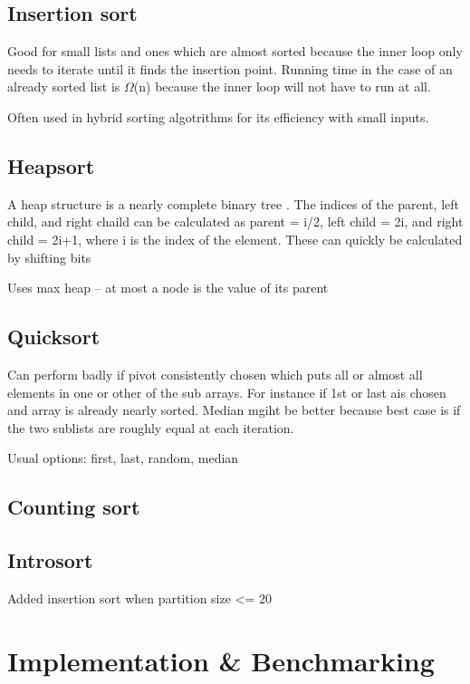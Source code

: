 \documentclass[12pt, a4paper]{article}
\begin{document}
\subsection{Insertion sort}

Good for small lists and ones which are almost sorted because the inner loop only needs to iterate until it finds the insertion point. Running time in the case of an already sorted list is $\Omega$(n) because the inner loop will not have to run at all.

Often used in hybrid sorting algotrithms for its efficiency with small inputs.

\subsection{Heapsort}

A heap structure is a nearly complete binary tree \autocite[p. 128]{cormen01}. The indices of the parent, left child, and right chaild can be calculated as parent = i/2, left child = 2i, and right child = 2i+1, where i is the index of the element. These can quickly be calculated by shifting bits \autocite[p. 128]{cormen01}

Uses max heap -- at most a node is the value of its parent
\subsection{Quicksort}

Can perform badly if pivot consistently chosen which puts all or almost all elements in one or other of the sub arrays. For instance if 1st or last ais chosen and array is already nearly sorted. Median mgiht be better because best case is if the two sublists are roughly equal at each iteration.

Usual options: first, last, random, median

\subsection{Counting sort}

\subsection{Introsort}

Added insertion sort when partition size <= 20 


\section{Implementation \& Benchmarking}
\end{document}
